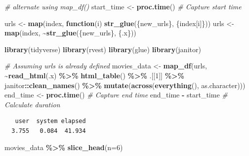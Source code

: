 \documentclass[
]{book}
\newenvironment{Shaded}{\begin{snugshade}}{\end{snugshade}}
\newcommand{\AttributeTok}[1]{\textcolor[rgb]{0.13,0.29,0.53}{#1}}
\newcommand{\CommentTok}[1]{\textcolor[rgb]{0.56,0.35,0.01}{\textit{#1}}}
\newcommand{\ControlFlowTok}[1]{\textcolor[rgb]{0.13,0.29,0.53}{\textbf{#1}}}
\newcommand{\DecValTok}[1]{\textcolor[rgb]{0.00,0.00,0.81}{#1}}
\newcommand{\FunctionTok}[1]{\textcolor[rgb]{0.13,0.29,0.53}{\textbf{#1}}}
\newcommand{\NormalTok}[1]{#1}
\newcommand{\OtherTok}[1]{\textcolor[rgb]{0.56,0.35,0.01}{#1}}
\newcommand{\SpecialCharTok}[1]{\textcolor[rgb]{0.81,0.36,0.00}{\textbf{#1}}}
\begin{document}
\begin{Shaded}
\begin{Highlighting}[]
\CommentTok{\# alternate using map\_df()}
\NormalTok{start\_time }\OtherTok{\textless{}{-}} \FunctionTok{proc.time}\NormalTok{() }\CommentTok{\# Capture start time}

\NormalTok{urls }\OtherTok{\textless{}{-}} \FunctionTok{map}\NormalTok{(index, }\ControlFlowTok{function}\NormalTok{(i) }\FunctionTok{str\_glue}\NormalTok{(\{new\_urls\}, \{index[i]\}))}
\NormalTok{urls }\OtherTok{\textless{}{-}} \FunctionTok{map}\NormalTok{(index, }\SpecialCharTok{\textasciitilde{}}\FunctionTok{str\_glue}\NormalTok{(\{new\_urls\}, \{.x\}))}

\FunctionTok{library}\NormalTok{(tidyverse)}
\FunctionTok{library}\NormalTok{(rvest)}
\FunctionTok{library}\NormalTok{(glue)}
\FunctionTok{library}\NormalTok{(janitor)}

\CommentTok{\# Assuming \textquotesingle{}urls\textquotesingle{} is already defined}
\NormalTok{movies\_data }\OtherTok{\textless{}{-}} \FunctionTok{map\_df}\NormalTok{(urls, }\SpecialCharTok{\textasciitilde{}}\FunctionTok{read\_html}\NormalTok{(.x) }\SpecialCharTok{\%\textgreater{}\%}
                        \FunctionTok{html\_table}\NormalTok{() }\SpecialCharTok{\%\textgreater{}\%}
\NormalTok{                        .[[}\DecValTok{1}\NormalTok{]] }\SpecialCharTok{\%\textgreater{}\%}
\NormalTok{                        janitor}\SpecialCharTok{::}\FunctionTok{clean\_names}\NormalTok{() }\SpecialCharTok{\%\textgreater{}\%} 
                        \FunctionTok{mutate}\NormalTok{(}\FunctionTok{across}\NormalTok{(}\FunctionTok{everything}\NormalTok{(), as.character))) }
\NormalTok{end\_time }\OtherTok{\textless{}{-}} \FunctionTok{proc.time}\NormalTok{() }\CommentTok{\# Capture end time}
\NormalTok{end\_time }\SpecialCharTok{{-}}\NormalTok{ start\_time }\CommentTok{\# Calculate duration}
\end{Highlighting}
\end{Shaded}

\begin{verbatim}
   user  system elapsed 
  3.755   0.084  41.934 
\end{verbatim}

\begin{Shaded}
\begin{Highlighting}[]
\NormalTok{movies\_data }\SpecialCharTok{\%\textgreater{}\%} \FunctionTok{slice\_head}\NormalTok{(}\AttributeTok{n=}\DecValTok{6}\NormalTok{)}
\end{Highlighting}
\end{Shaded}
\end{document}
